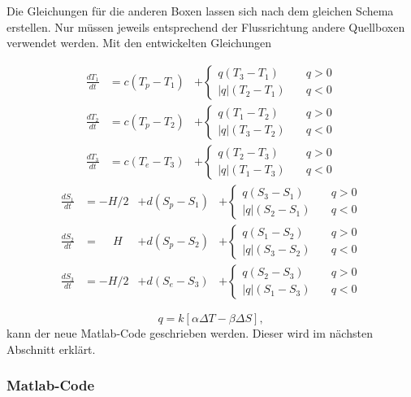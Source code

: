 Die Gleichungen für die anderen Boxen lassen sich nach dem gleichen Schema erstellen. Nur müssen jeweils entsprechend der Flussrichtung andere Quellboxen verwendet werden. Mit den entwickelten Gleichungen 

\begin{equation}
\begin{aligned}
\frac{dT_1}{dt} &= c(T_p-T_1)&+ \begin{cases} q(T_3-T_1) & \quad q>0 \\ |q|(T_2-T_1) & \quad q<0 \end{cases}
\\
\frac{dT_2}{dt} &= c(T_p-T_2)&+\begin{cases} q(T_1-T_2) & \quad q>0 \\ |q|(T_3-T_2) & \quad q<0 \end{cases}
\\
\frac{dT_3}{dt} &= c(T_e-T_3)&+\begin{cases} q(T_2-T_3) & \quad q>0 \\ |q|(T_1-T_3) & \quad q<0 \end{cases}
\end{aligned}
\end{equation}
\begin{equation}
\begin{aligned}
\frac{dS_1}{dt} &= -H/2 &+ d(S_p-S_1)&+\begin{cases} q(S_3-S_1) & \quad q>0 \\ |q|(S_2-S_1) & \quad q<0 \end{cases}
\\
\frac{dS_2}{dt} &= \phantom{-}H &+ d(S_p-S_2)&+\begin{cases} q(S_1-S_2) & \quad q>0 \\ |q|(S_3-S_2) & \quad q<0 \end{cases}	
\\
\frac{dS_3}{dt} &= -H/2 &+d(S_e-S_3)&+\begin{cases} q(S_2-S_3) & \quad q>0 \\ |q|(S_1-S_3) & \quad q<0 \end{cases}
\end{aligned}
\end{equation}

\begin{equation}
q = k[\alpha\Delta T-\beta\Delta S],
\end{equation}
kann der neue Matlab-Code geschrieben werden. Dieser wird im nächsten Abschnitt erklärt.


\subsubsection{Matlab-Code}


